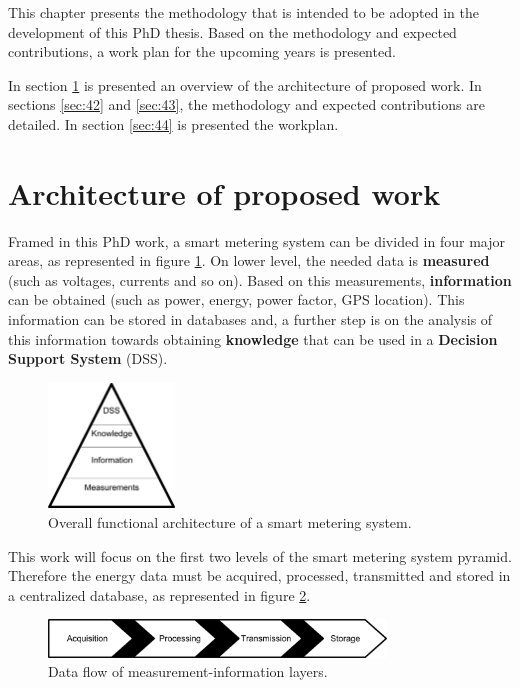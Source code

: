 
This chapter presents the methodology that is intended to be adopted in the development of this PhD thesis. Based on the methodology and expected contributions, a work plan for the upcoming years is presented.

In section \ref{sec:41} is presented an overview of the architecture of proposed work. In sections \ref{sec:42} and \ref{sec:43}, the methodology and expected contributions are detailed. In section \ref{sec:44} is presented the workplan.

\section{Architecture of proposed work}
\label{sec:41}


Framed in this PhD work, a smart metering system can be divided in four major areas, as represented in figure \ref{fig:41topLevel}. On lower level, the needed data is \textbf{measured} (such as voltages, currents and so on). Based on this measurements, \textbf{information} can be obtained (such as power, energy, power factor, GPS location). This information can be stored in databases and, a further step is on the analysis of this information towards obtaining \textbf{knowledge} that can be used in a \textbf{Decision Support System} (DSS).

\begin{figure}[h!]
	\centering
	\vspace{-1em}
	\includegraphics[width=0.3\textwidth,keepaspectratio]{figures/4.Method/pyramid}
	\caption{Overall functional architecture of a smart metering system.}
	\label{fig:41topLevel}
\end{figure}

This work will focus on the first two levels of the smart metering system pyramid. Therefore the energy data must be acquired, processed, transmitted and stored in a centralized database, as represented in figure \ref{fig:41dataFlow}.

\begin{figure}[h!]
	\centering
	\includegraphics[width=0.8\textwidth,keepaspectratio]{figures/4.Method/data_flow}
	\caption{Data flow of measurement-information layers.}
	\label{fig:41dataFlow}
\end{figure}


